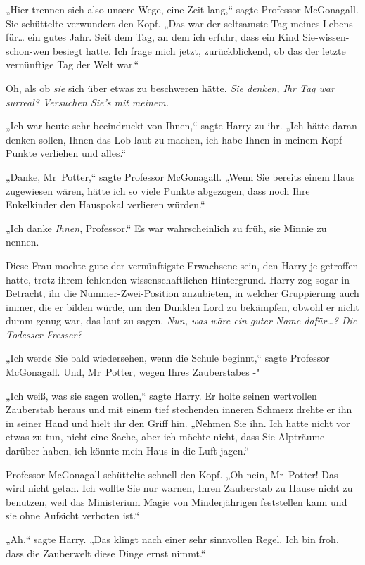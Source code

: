 {„Hier trennen sich also unsere Wege, eine Zeit lang,“ sagte Professor McGonagall. Sie schüttelte verwundert den Kopf. „Das war der seltsamste Tag meines Lebens für… ein gutes Jahr. Seit dem Tag, an dem ich erfuhr, dass ein Kind Sie-wissen-schon-wen besiegt hatte. Ich frage mich jetzt, zurückblickend, ob das der letzte vernünftige Tag der Welt war.“

Oh, als ob \emph{sie} sich über etwas zu beschweren hätte. \emph{Sie denken, Ihr Tag war surreal? Versuchen Sie's mit meinem.}

„Ich war heute sehr beeindruckt von Ihnen,“ sagte Harry zu ihr. „Ich hätte daran denken sollen, Ihnen das Lob laut zu machen, ich habe Ihnen in meinem Kopf Punkte verliehen und alles.“

„Danke, Mr~Potter,“ sagte Professor McGonagall. „Wenn Sie bereits einem Haus zugewiesen wären, hätte ich so viele Punkte abgezogen, dass noch Ihre Enkelkinder den Hauspokal verlieren würden.“

„Ich danke \emph{Ihnen}, Professor.“ Es war wahrscheinlich zu früh, sie Minnie zu nennen.

Diese Frau mochte gute der vernünftigste Erwachsene sein, den Harry je getroffen hatte, trotz ihrem fehlenden wissenschaftlichen Hintergrund. Harry zog sogar in Betracht, ihr die Nummer-Zwei-Position anzubieten, in welcher Gruppierung auch immer, die er bilden würde, um den Dunklen Lord zu bekämpfen, obwohl er nicht dumm genug war, das laut zu sagen. \emph{Nun, was wäre ein guter Name dafür…? Die Todesser-Fresser?}

„Ich werde Sie bald wiedersehen, wenn die Schule beginnt,“ sagte Professor McGonagall. Und, Mr~Potter, wegen Ihres Zauberstabes -"

„Ich weiß, was sie sagen wollen,“ sagte Harry. Er holte seinen wertvollen Zauberstab heraus und mit einem tief stechenden inneren Schmerz drehte er ihn in seiner Hand und hielt ihr den Griff hin. „Nehmen Sie ihn. Ich hatte nicht vor etwas zu tun, nicht eine Sache, aber ich möchte nicht, dass Sie Alpträume darüber haben, ich könnte mein Haus in die Luft jagen.“

Professor McGonagall schüttelte schnell den Kopf. „Oh nein, Mr~Potter! Das wird nicht getan. Ich wollte Sie nur warnen, Ihren Zauberstab zu Hause nicht zu benutzen, weil das Ministerium Magie von Minderjährigen feststellen kann und sie ohne Aufsicht verboten ist.“

„Ah,“ sagte Harry. „Das klingt nach einer sehr sinnvollen Regel. Ich bin froh, dass die Zauberwelt diese Dinge ernst nimmt.“

}
